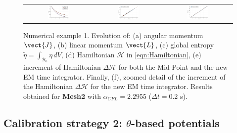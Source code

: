 \begin{figure}[hbtp]
	\centering
	\begin{tabular}{ccc}
		\includegraphics[width=0.33\textwidth]{Figures/PotentialStudy/_PhysicalExperiments_MooneyRivlin_ID_E0_D1} &
		\includegraphics[width=0.33\textwidth]{Figures/PotentialStudy/e_pol_E0_CorrelationTest} &
		\includegraphics[width=0.33\textwidth]{Figures/PotentialStudy/e_pol_theta_CorrelationTest} \\
		
	\end{tabular}
	\caption{Numerical example 1. Evolution of: (a) angular momentum $\vect{J}$, (b) linear momentum $\vect{L}$, (c) global entropy $\tilde{\eta}=\int_{\mathcal{B}_0}\eta\,dV$, (d) Hamiltonian $\mathcal{H}$  in \eqref{eqn:Hamiltonian}, (e) increment of Hamiltonian $\Delta\mathcal{H}$ for both the Mid-Point and the new EM time integrator.  Finally, (f), zoomed detail of the increment of the Hamiltonian  $\Delta\mathcal{H}$ for the new EM time integrator. Results obtained for \textbf{Mesh2} with $\alpha_{CFL}=2.2955$ ($\Delta t=0.2$ s).}
	\label{fig:example 1 energy balance}
\end{figure}



\clearpage


\subsection{Calibration strategy 2: $\theta$-based potentials}



